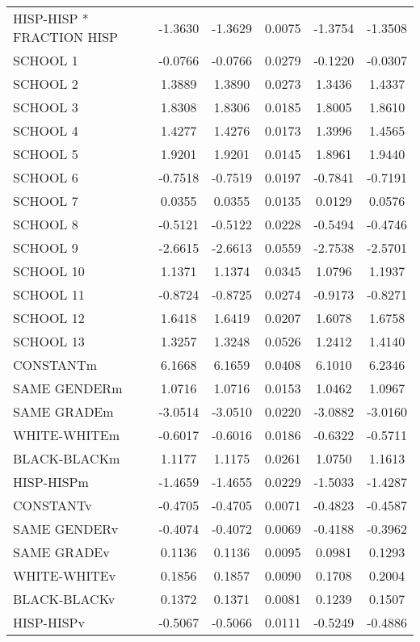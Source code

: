 \documentclass[12pt,letterpaper]{article}
\begin{document}
\begin{small}
\begin{table}[ht]
\begin{tabular}{l|ccccc}
  HISP-HISP * FRACTION HISP & -1.3630 & -1.3629 & 0.0075 & -1.3754 & -1.3508 \\ 
  SCHOOL 1 & -0.0766 & -0.0766 & 0.0279 & -0.1220 & -0.0307 \\ 
  SCHOOL 2 & 1.3889 & 1.3890 & 0.0273 & 1.3436 & 1.4337 \\ 
  SCHOOL 3 & 1.8308 & 1.8306 & 0.0185 & 1.8005 & 1.8610 \\ 
  SCHOOL 4 & 1.4277 & 1.4276 & 0.0173 & 1.3996 & 1.4565 \\ 
  SCHOOL 5 & 1.9201 & 1.9201 & 0.0145 & 1.8961 & 1.9440 \\ 
  SCHOOL 6 & -0.7518 & -0.7519 & 0.0197 & -0.7841 & -0.7191 \\ 
  SCHOOL 7 & 0.0355 & 0.0355 & 0.0135 & 0.0129 & 0.0576 \\ 
  SCHOOL 8 & -0.5121 & -0.5122 & 0.0228 & -0.5494 & -0.4746 \\ 
  SCHOOL 9 & -2.6615 & -2.6613 & 0.0559 & -2.7538 & -2.5701 \\ 
  SCHOOL 10 & 1.1371 & 1.1374 & 0.0345 & 1.0796 & 1.1937 \\ 
  SCHOOL 11 & -0.8724 & -0.8725 & 0.0274 & -0.9173 & -0.8271 \\ 
  SCHOOL 12 & 1.6418 & 1.6419 & 0.0207 & 1.6078 & 1.6758 \\ 
  SCHOOL 13 & 1.3257 & 1.3248 & 0.0526 & 1.2412 & 1.4140 \\ 
  CONSTANTm & 6.1668 & 6.1659 & 0.0408 & 6.1010 & 6.2346 \\ 
  SAME GENDERm & 1.0716 & 1.0716 & 0.0153 & 1.0462 & 1.0967 \\ 
  SAME GRADEm & -3.0514 & -3.0510 & 0.0220 & -3.0882 & -3.0160 \\ 
  WHITE-WHITEm & -0.6017 & -0.6016 & 0.0186 & -0.6322 & -0.5711 \\ 
  BLACK-BLACKm & 1.1177 & 1.1175 & 0.0261 & 1.0750 & 1.1613 \\ 
  HISP-HISPm & -1.4659 & -1.4655 & 0.0229 & -1.5033 & -1.4287 \\ 
  CONSTANTv & -0.4705 & -0.4705 & 0.0071 & -0.4823 & -0.4587 \\ 
  SAME GENDERv & -0.4074 & -0.4072 & 0.0069 & -0.4188 & -0.3962 \\ 
  SAME GRADEv & 0.1136 & 0.1136 & 0.0095 & 0.0981 & 0.1293 \\ 
  WHITE-WHITEv & 0.1856 & 0.1857 & 0.0090 & 0.1708 & 0.2004 \\ 
  BLACK-BLACKv & 0.1372 & 0.1371 & 0.0081 & 0.1239 & 0.1507 \\ 
  HISP-HISPv & -0.5067 & -0.5066 & 0.0111 & -0.5249 & -0.4886 \\ 
   \hline
\end{tabular}
\end{table}



\end{small}
\end{document}
